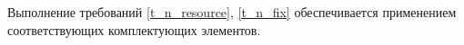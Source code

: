 Выполнение требований \ref{t_n_resource}, \ref{t_n_fix} обеспечивается применением соответствующих комплектующих элементов.